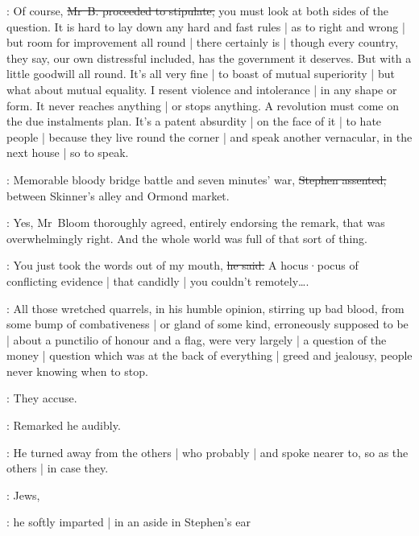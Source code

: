 \Bloom:
Of course,
\sout{Mr~B. proceeded to stipulate,}
you must look at both sides of the question.
It is hard to lay down any hard and fast rules |
as to right and wrong |
but room for improvement all round |
there certainly is |
though every country,
they say,
our own distressful included,
has the government it deserves.
But with a little goodwill all round.
It's all very fine |
to boast of mutual superiority |
but what about mutual equality.
I resent violence and intolerance |
in any shape or form.
It never reaches anything |
or stops anything.
A revolution must come on the due instalments plan.
It's a patent absurdity |
on the face of it |
to hate people |
because they live round the corner |
and speak another vernacular,
in the next house |
so to speak.

\Stephen:
Memorable bloody bridge battle and seven minutes' war,
\sout{Stephen assented,}
between Skinner's alley and Ormond market.

:
Yes,
Mr~Bloom thoroughly agreed,
entirely endorsing the remark,
that was overwhelmingly right.
And the whole world was full of that sort of thing.

\Bloom:
You just took the words out of my mouth,
\sout{he said.}
A hocus·pocus of conflicting evidence |
that candidly |
you couldn't remotely\ldots.%

:
All those wretched quarrels,
in his humble opinion,
stirring up bad blood,
from some bump of combativeness |
or gland of some kind,
erroneously supposed to be |
about a punctilio of honour and a flag,
were very largely |
a question of the money |
question which was at the back of everything |
greed and jealousy,
people never knowing when to stop.

\Bloom:
They accuse.

:
Remarked he audibly.

:
He turned away from the others |
who probably |
and spoke nearer to,
so as the others |
in case they.

\Bloom:
Jews,

:
he softly imparted |
in an aside in Stephen's ear

